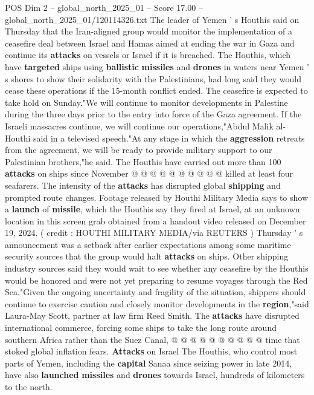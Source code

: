 \begin{textsample}{POS Dim 2 – global\_north\_2025\_01 – Score 17.00 – global\_north\_2025\_01/120114326.txt}  \label{ex:f2_pos_399}
The leader of Yemen ' s Houthis said on Thursday that the Iran-aligned group would monitor the implementation of a ceasefire deal between Israel and Hamas aimed at ending the war in Gaza and continue its \textbf{attacks} on vessels or Israel if it is breached.
The Houthis, which have \textbf{targeted} ships using \textbf{ballistic} \textbf{missiles} and \textbf{drones} in waters near Yemen ' s shores to show their solidarity with the Palestinians, had long said they would cease these operations if the 15-month conflict ended.
The ceasefire is expected to take hold on Sunday."We will continue to monitor developments in Palestine during the three days prior to the entry into force of the Gaza agreement.
If the Israeli massacres continue, we will continue our operations,"Abdul Malik al-Houthi said in a televised speech."At any stage in which the \textbf{aggression} retreats from the agreement, we will be ready to provide military support to our Palestinian brothers,"he said.
The Houthis have carried out more than 100 \textbf{attacks} on ships since November @ @ @ @ @ @ @ @ @ @ killed at least four seafarers.
The intensity of the \textbf{attacks} has disrupted global \textbf{shipping} and prompted route changes.
Footage released by Houthi Military Media says to show a \textbf{launch} of \textbf{missile}, which the Houthis say they fired at Israel, at an unknown location in this screen grab obtained from a handout video released on December 19, 2024. ( credit : HOUTHI MILITARY MEDIA/via REUTERS ) Thursday ' s announcement was a setback after earlier expectations among some maritime security sources that the group would halt \textbf{attacks} on ships.
Other shipping industry sources said they would wait to see whether any ceasefire by the Houthis would be honored and were not yet preparing to resume voyages through the Red Sea."Given the ongoing uncertainty and fragility of the situation, shippers should continue to exercise caution and closely monitor developments in the \textbf{region},"said Laura-May Scott, partner at law firm Reed Smith.
The \textbf{attacks} have disrupted international commerce, forcing some ships to take the long route around southern Africa rather than the Suez Canal, @ @ @ @ @ @ @ @ @ @ time that stoked global inflation fears. \textbf{Attacks} on Israel The Houthis, who control most parts of Yemen, including the \textbf{capital} Sanaa since seizing power in late 2014, have also \textbf{launched} \textbf{missiles} and \textbf{drones} towards Israel, hundreds of kilometers to the north.

\end{textsample}
